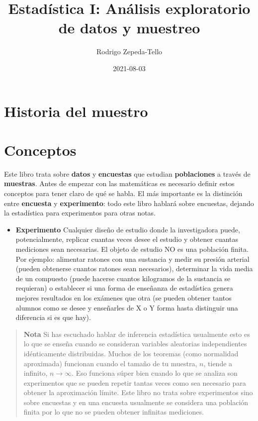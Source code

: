 \documentclass[
]{book}
\title{Estadística I: Análisis exploratorio de datos y muestreo}
\author{Rodrigo Zepeda-Tello}
\date{2021-08-03}
\providecommand{\tightlist}{%
  \setlength{\itemsep}{0pt}\setlength{\parskip}{0pt}}
\begin{document}
\maketitle

{
\setcounter{tocdepth}{1}
\tableofcontents
}
\hypertarget{historia-del-muestro}{%
\chapter{Historia del muestro}\label{historia-del-muestro}}

\hypertarget{conceptos}{%
\chapter{Conceptos}\label{conceptos}}

Este libro trata sobre \textbf{datos} y \textbf{encuestas} que estudian \textbf{poblaciones} a través de \textbf{muestras}. Antes de empezar con las matemáticas es necesario definir estos conceptos para tener claro de qué se habla. El más importante es la distinción entre \textbf{encuesta} y \textbf{experimento}: todo este libro hablará sobre encuestas, dejando la estadística para experimentos para otras notas.

\begin{itemize}
\tightlist
\item
  \textbf{Experimento} Cualquier diseño de estudio donde la investigadora puede, potencialmente, replicar cuantas veces desee el estudio y obtener cuantas mediciones sean necesarias. El objeto de estudio NO es una población finita. Por ejemplo: alimentar ratones con una sustancia y medir su presión arterial (pueden obtenerse cuantos ratones sean necesarios), determinar la vida media de un compuesto (puede hacerse cuantos kilogramos de la sustancia se requieran) o establecer si una forma de enseñanza de estadística genera mejores resultados en los exámenes que otra (se pueden obtener tantos alumnos como se desee y enseñarles de X o Y forma hasta distinguir una diferencia si es que hay).
\end{itemize}

\begin{quote}
\textbf{Nota} Si has escuchado hablar de inferencia estadística usualmente esto es lo que se enseña cuando se consideran variables aleatorias independientes idénticamente distribuidas. Muchos de los teoremas (como normalidad aproximada) funcionan cuando el tamaño de tu muestra, \(n\), tiende a infinito, \(n \to \infty\). Eso funciona súper bien cuando lo que se analiza son experimentos que se pueden repetir tantas veces como sea necesario para obtener la aproximación límite. Este libro no trata sobre experimentos sino sobre encuestas y en una encuesta usualmente se considera una población finita por lo que no se pueden obtener infinitas mediciones.
\end{quote}
\end{document}

